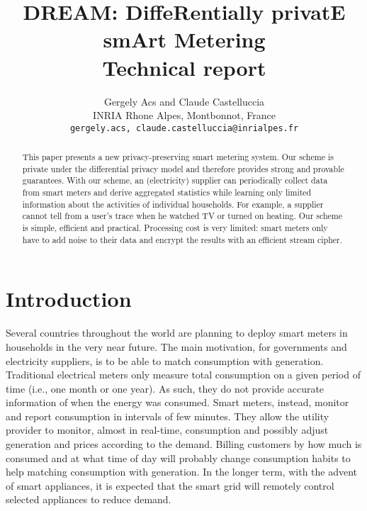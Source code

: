 \documentclass[11pt,a4paper]{article}
\theoremstyle{plain}
\theoremstyle{plain}
\theoremstyle{plain}
\theoremstyle{plain}
\theoremstyle{nonumberplain} \theoremseparator{}
\begin{document}
\title{DREAM: DiffeRentially privatE smArt Metering \\ 
{\large Technical report}}

\author{Gergely Acs and Claude Castelluccia \\
INRIA Rhone Alpes, Montbonnot, France \\
\texttt{{gergely.acs, claude.castelluccia}@inrialpes.fr} \\ }
\date{}



\maketitle
\sloppy

 \setlength{\textfloatsep}{0.3cm}
\begin{abstract}
This paper presents a new privacy-preserving smart metering system.
Our scheme is private under the differential privacy model
and therefore provides strong and provable  guarantees. 
With our scheme, an (electricity) supplier can periodically collect data from smart
meters and derive aggregated statistics while learning only limited information about
the activities of individual households. 
For example, a supplier cannot 
tell from a user's trace when he watched TV or turned on heating. 
Our scheme is simple, efficient and practical. Processing cost is very limited:  
smart meters only have to add noise to their data and encrypt the results with 
an efficient stream cipher.
\end{abstract}

\newpage
\tableofcontents
\newpage

\section{Introduction}


Several countries throughout the world are planning to deploy smart meters in households in the very near future.
The main motivation, for governments and electricity suppliers, is to be able to match consumption with generation. 
Traditional electrical meters only measure total consumption on a given period of time (i.e., one month or one year). As such, 
they do not provide accurate information of when the energy was consumed. 
Smart meters, instead, monitor and report consumption in intervals of few minutes. 
They allow the utility provider to monitor, almost in real-time, consumption and possibly adjust generation and prices according 
to the demand. Billing customers by how much is consumed and at what time of day will probably change consumption habits to 
help matching consumption with generation. In the longer term, with the advent of smart appliances, it is expected that the smart grid 
will remotely control selected appliances to reduce demand.
\end{document}
